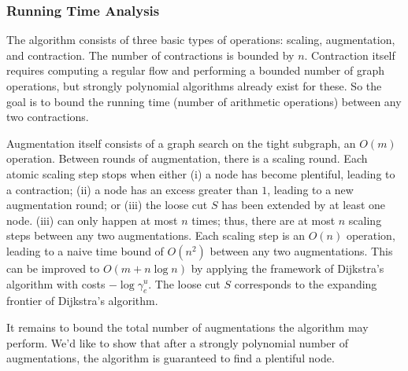 \documentclass[11pt]{article}
\theoremstyle{definition}
\theoremstyle{definition}
\begin{document}
		\subsubsection{Running Time Analysis}
		The algorithm consists of three basic types of operations: scaling, augmentation, and contraction.
		The number of contractions is bounded by $n$. Contraction itself
		requires computing a regular flow and performing a bounded number of graph operations, but
		strongly polynomial algorithms already exist for these. So the goal is to bound the running time
		(number of arithmetic operations) between any two contractions.
		
		Augmentation itself consists of a graph search on the tight subgraph, an $O(m)$ operation.
		Between rounds of augmentation, there is a scaling round. Each atomic scaling step stops
		when either (i) a node has become plentiful, leading to a contraction; (ii) a node has an
		excess greater than $1$, leading to a new augmentation round; or (iii) the loose cut
		$S$ has been extended by at least one node. (iii) can only happen at most $n$ times; thus,
		there are at most $n$ scaling steps between any two augmentations. Each scaling step
		is an $O(n)$ operation, leading to a naive time bound of $O(n^2)$ between any two augmentations.
		This can be improved to $O(m + n \log n)$ by applying the framework of Dijkstra's
		algorithm with costs $-\log \gamma^u_e$. The loose cut $S$ corresponds to the expanding
		frontier of Dijkstra's algorithm.
		
		It remains to bound the total number of augmentations the algorithm may perform. We'd
		like to show that after a strongly polynomial number of augmentations, the algorithm
		is guaranteed to find a plentiful node.
		
\end{document}
